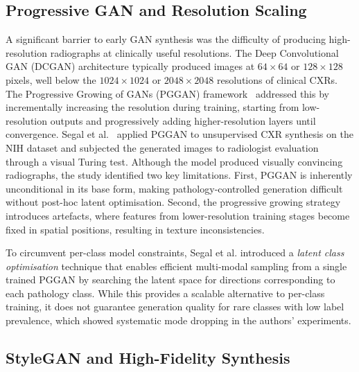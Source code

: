 \subsection{Progressive GAN and Resolution Scaling}

A significant barrier to early GAN synthesis was the difficulty of producing high-resolution
radiographs at clinically useful resolutions. The Deep Convolutional GAN (DCGAN) architecture
typically produced images at $64 \times 64$ or $128 \times 128$ pixels, well below the
$1024 \times 1024$ or $2048 \times 2048$ resolutions of clinical CXRs. The Progressive
Growing of GANs (PGGAN) framework~\cite{Karras2018ProGAN} addressed this by incrementally
increasing the resolution during training, starting from low-resolution outputs and
progressively adding higher-resolution layers until convergence. Segal et al.~\cite{Segal2021}
applied PGGAN to unsupervised CXR synthesis on the NIH dataset and subjected the
generated images to radiologist evaluation through a visual Turing test. Although the model
produced visually convincing radiographs, the study identified two key limitations. First,
PGGAN is inherently unconditional in its base form, making pathology-controlled generation
difficult without post-hoc latent optimisation. Second, the progressive growing strategy
introduces artefacts, where features from lower-resolution training
stages become fixed in spatial positions, resulting in texture inconsistencies.

To circumvent per-class model constraints, Segal et al. introduced a \emph{latent class
optimisation} technique that enables efficient multi-modal sampling from a single trained
PGGAN by searching the latent space for directions corresponding to each pathology class.
While this provides a scalable alternative to per-class training, it does not guarantee
generation quality for rare classes with low label prevalence, which showed systematic mode
dropping in the authors' experiments.

\subsection{StyleGAN and High-Fidelity Synthesis}

